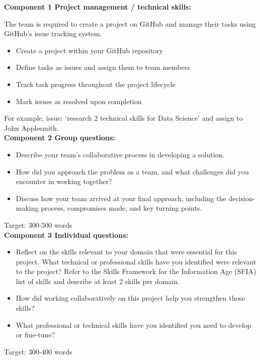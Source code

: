 \documentclass[a4paper, 11pt]{report}
\begin{document}
\textbf{Component 1 Project management / technical skills:}

The team is required to create a project on GitHub and manage their tasks using GitHub’s issue tracking system.

\begin{itemize}
    \item Create a project within your GitHub repository
    \item Define tasks as issues and assign them to team members
    \item Track task progress throughout the project lifecycle
    \item Mark issues as resolved upon completion
\end{itemize}
For example, issue: ‘research 2 technical skills for Data Science’ and assign to John Applesmith. \\[2mm]

\textbf{Component 2 Group questions:}

\begin{itemize}
    \item Describe your team’s collaborative process in developing a solution.
    \item How did you approach the problem as a team, and what challenges did you encounter in working together? 
    \item Discuss how your team arrived at your final approach, including the decision-making process, compromises made, and key turning points. 
\end{itemize}
Target: 300-500 words \\[2mm]

\textbf{Component 3 Individual questions:}
\begin{itemize}
    \item Reflect on the skills relevant to your domain that were essential for this project. What technical or professional skills have you identified were relevant to the project? Refer to the Skills Framework for the Information Age (SFIA) list of skills \cite{sfia} and describe at least 2 skills per domain. 
    \item How did working collaboratively on this project help you strengthen those skills? 
    \item What professional or technical skills have you identified you need to develop or fine-tune?
\end{itemize}

Target: 300-400 words \\[2mm]
\end{document}
